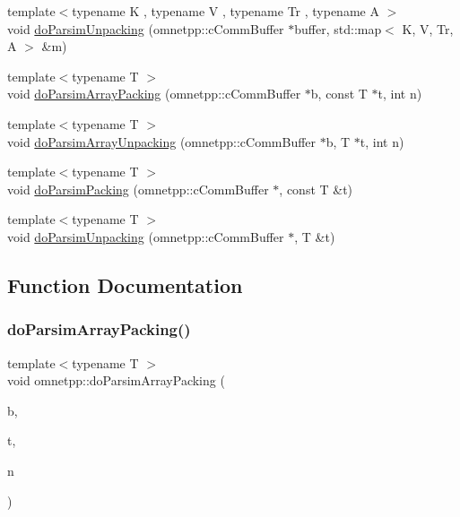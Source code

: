 \begin{DoxyCompactItemize}
\item 
{\footnotesize template$<$typename K , typename V , typename Tr , typename A $>$ }\\void \hyperlink{namespaceomnetpp_a6fd2557203871e46db43fa9c63968117}{do\+Parsim\+Unpacking} (omnetpp\+::c\+Comm\+Buffer $\ast$buffer, std\+::map$<$ K, V, Tr, A $>$ \&m)
\item 
{\footnotesize template$<$typename T $>$ }\\void \hyperlink{namespaceomnetpp_a55066a1505082b338d233957ee65f0ac}{do\+Parsim\+Array\+Packing} (omnetpp\+::c\+Comm\+Buffer $\ast$b, const T $\ast$t, int n)
\item 
{\footnotesize template$<$typename T $>$ }\\void \hyperlink{namespaceomnetpp_aace4e02d3cd181249cf81a4bf8827fa7}{do\+Parsim\+Array\+Unpacking} (omnetpp\+::c\+Comm\+Buffer $\ast$b, T $\ast$t, int n)
\item 
{\footnotesize template$<$typename T $>$ }\\void \hyperlink{namespaceomnetpp_a41f5f036ca92034bc3b29ad1f9f96903}{do\+Parsim\+Packing} (omnetpp\+::c\+Comm\+Buffer $\ast$, const T \&t)
\item 
{\footnotesize template$<$typename T $>$ }\\void \hyperlink{namespaceomnetpp_a7336b297a32484942d52667dae7c7248}{do\+Parsim\+Unpacking} (omnetpp\+::c\+Comm\+Buffer $\ast$, T \&t)
\end{DoxyCompactItemize}


\subsection{Function Documentation}
\mbox{\label{namespaceomnetpp_a55066a1505082b338d233957ee65f0ac}} 
\subsubsection{\texorpdfstring{do\+Parsim\+Array\+Packing()}{doParsimArrayPacking()}}
{\footnotesize\ttfamily template$<$typename T $>$ \\
void omnetpp\+::do\+Parsim\+Array\+Packing (\begin{DoxyParamCaption}\item[{omnetpp\+::c\+Comm\+Buffer $\ast$}]{b,  }\item[{const T $\ast$}]{t,  }\item[{int}]{n }\end{DoxyParamCaption})}



